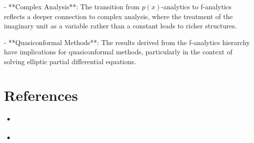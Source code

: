 \documentclass[11pt,a4paper]{article}
\begin{document}
- **Complex Analysis**: The transition from $p(x)$-analytics to f-analytics reflects a deeper connection to complex analysis, where the treatment of the imaginary unit as a variable rather than a constant leads to richer structures.

- **Quasiconformal Methods**: The results derived from the f-analytics hierarchy have implications for quasiconformal methods, particularly in the context of solving elliptic partial differential equations.

\section{References}
\begin{itemize}
    \item \cite{2602.19251v1}
    \item \cite{2601.19274v4}
\end{itemize}
\end{document}

